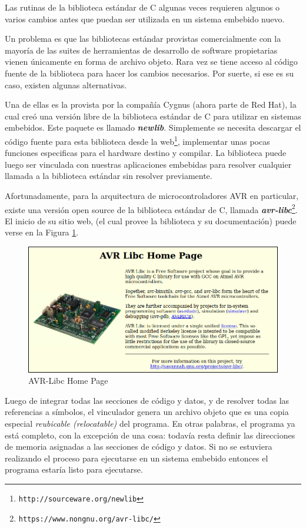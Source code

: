 \documentclass[output=paper, 
colorlinks,
citecolor=brown,
newtxmath
]{langscibook}
\begin{document}
Las rutinas de la biblioteca estándar de C algunas veces requieren 
algunos o varios cambios antes que puedan ser utilizada en un sistema 
embebido nuevo.

Un problema es que las bibliotecas estándar provistas comercialmente
con la mayoría de las 
suites de herramientas de desarrollo de software propietarias
vienen únicamente en forma de archivo objeto.
Rara vez se tiene acceso al código fuente de la biblioteca para hacer los 
cambios necesarios. Por suerte, si ese es su caso, existen algunas 
alternativas. 

Una de ellas es
la provista por la compañía Cygnus (ahora parte de Red Hat),
la cual creó una versión libre de la biblioteca estándar de C para utilizar 
en sistemas embebidos.
Este paquete es llamado \textit{\textbf{newlib}}. Simplemente se necesita descargar el código fuente
para esta biblioteca desde la web\footnote{\texttt{http://sourceware.org/newlib}},
implementar unas pocas funciones especificas para el hardware destino y compilar.
La biblioteca puede luego ser vinculada con nuestras aplicaciones embebidas
para resolver cualquier llamada a la biblioteca estándar sin 
resolver previamente. 

Afortunadamente, para la arquitectura de microcontroladores AVR en particular, 
existe una versión open source de la biblioteca estándar de C, llamada 
\textit{\textbf{avr-libc}}\footnote{\texttt{https://www.nongnu.org/avr-libc/}}. 
El inicio de su sitio web,
(el cual provee la biblioteca y su documentación) puede verse en la Figura \ref{fig:avr_libc}.


\begin{figure}[H]
\includegraphics[width=12cm]{images/avr-libc2.png}
\caption{AVR-Libc Home Page}
\label{fig:avr_libc}
\end{figure}


Luego de integrar todas las secciones de código y datos, y de resolver todas
las referencias a símbolos, el vinculador genera un archivo objeto que es
una copia especial \textit{reubicable (relocatable)} del programa. 
En otras palabras,
el programa ya está completo, con la excepción de una cosa: todavía
resta definir las direcciones de memoria asignadas a las secciones de código y 
datos. Si no se estuviera realizando el proceso para ejecutarse en un 
sistema embebido entonces el programa estaría listo para ejecutarse.
\end{document}
